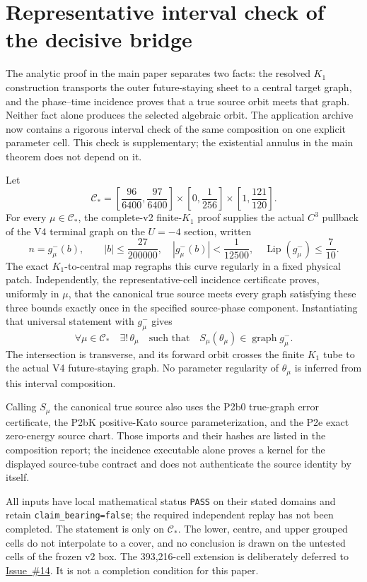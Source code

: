 \documentclass[11pt,reqno]{amsart}
\begin{document}
\section{Representative interval check of the decisive bridge}

The analytic proof in the main paper separates two facts: the resolved
$K_1$ construction transports the outer future-staying sheet to a central
target graph, and the phase--time incidence proves that a true source orbit
meets that graph.  Neither fact alone produces the selected algebraic orbit.
The application archive now contains a rigorous interval check of the same
composition on one explicit parameter cell.  This check is supplementary;
the existential annulus in the main theorem does not depend on it.

Let
\[
 \mathcal C_*
 =\left[\frac{96}{6400},\frac{97}{6400}\right]
  \times\left[0,\frac1{256}\right]
  \times\left[1,\frac{121}{120}\right].
\]
For every $\mu\in\mathcal C_*$, the complete-v2 finite-$K_1$ proof supplies
the actual $C^3$ pullback of the V4 terminal graph on the $U=-4$ section,
written
\[
 n=g^-_\mu(b),\qquad
 |b|\le\frac{27}{200000},\quad
 |g^-_\mu(b)|<\frac1{12500},\quad
 \operatorname{Lip}(g^-_\mu)\le\frac7{10}.
\]
The exact $K_1$-to-central map regraphs this curve regularly in a fixed
physical patch.  Independently, the representative-cell incidence
certificate proves, uniformly in $\mu$, that the canonical true source meets
every graph satisfying these three bounds exactly once in the specified
source-phase component.  Instantiating that universal statement with
$g^-_\mu$ gives
\[
 \forall\mu\in\mathcal C_*\quad\exists!\,\theta_\mu
 \quad\text{such that}\quad
 S_\mu(\theta_\mu)\in\operatorname{graph}g^-_\mu.
\]
The intersection is transverse, and its forward orbit crosses the finite
$K_1$ tube to the actual V4 future-staying graph.  No parameter regularity of
$\theta_\mu$ is inferred from this interval composition.

Calling $S_\mu$ the canonical true source also uses the P2b0 true-graph
error certificate, the P2bK positive-Kato source parameterization, and the
P2e exact zero-energy source chart.  Those imports and their hashes are
listed in the composition report; the incidence executable alone proves a
kernel for the displayed source-tube contract and does not authenticate the
source identity by itself.

All inputs have local mathematical status \texttt{PASS} on their stated
domains and retain \texttt{claim\_bearing=false}; the required independent
replay has not been completed.  The statement is only on $\mathcal C_*$.
The lower, centre, and upper grouped cells do not interpolate to a cover, and
no conclusion is drawn on the untested cells of the frozen v2 box.  The
393,216-cell extension is deliberately deferred to
\href{https://github.com/h-lu/rfsn-ii-positive-parameter-pde/issues/14}
{Issue~\#14}.  It is not a completion condition for this paper.
\end{document}
